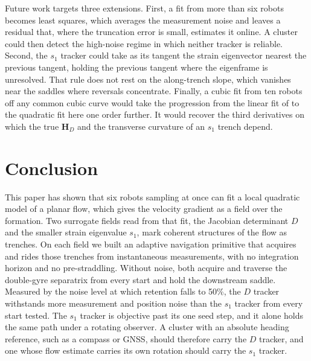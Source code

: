 \documentclass[lettersize,journal]{IEEEtran}
\begin{document}
Future work targets three extensions. First, a fit from more than six
robots becomes least squares, which averages the measurement noise and
leaves a residual that, where the truncation error is small, estimates
it online. A cluster could then detect the
high-noise regime in which neither tracker is reliable. Second, the
$s_1$ tracker could take as its tangent the strain eigenvector nearest the
previous tangent, holding the previous tangent where the eigenframe is
unresolved. That rule does not rest on the along-trench slope, which
vanishes near the saddles where reversals concentrate. Finally, a cubic fit
from ten robots off any common cubic curve would take the progression from
the linear fit of \cite{10} to the quadratic fit here one order further. It
would recover the third derivatives on which the true $\mathbf{H}_D$ and
the transverse curvature of an $s_1$ trench depend.

\section{Conclusion}

This paper has shown that six robots sampling at once can fit a local
quadratic model of a planar flow, which gives the velocity gradient as a
field over the formation. Two surrogate fields read from that fit, the
Jacobian determinant $D$ and the smaller strain eigenvalue $s_1$, mark
coherent structures of the flow as trenches. On each field we built an
adaptive navigation primitive that acquires and rides those trenches from
instantaneous measurements, with no integration horizon and no
pre-straddling. Without noise, both acquire and traverse the
double-gyre separatrix from every start and hold the downstream saddle. Measured
by the noise level at which retention falls to 50\%, the $D$ tracker
withstands more measurement and position noise than the $s_1$ tracker from
every start tested. The $s_1$ tracker is objective past its
one seed step, and it alone holds the same path under a rotating observer.
A cluster with an absolute heading reference, such as a compass or GNSS,
should therefore carry the $D$ tracker, and one whose flow estimate
carries its own rotation should carry the $s_1$ tracker.
\end{document}
